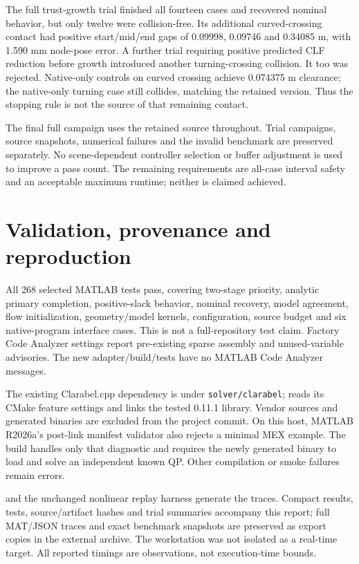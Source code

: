 \documentclass[11pt]{article}
\begin{document}
The full trust-growth trial finished all fourteen cases and recovered nominal
behavior, but only twelve were collision-free. Its additional curved-crossing
contact had positive start/mid/end gaps of 0.09998, 0.09746 and 0.34085 m, with
1.590 mm node-pose error. A further trial requiring positive predicted CLF
reduction before growth introduced another turning-crossing collision. It too
was rejected. Native-only controls on curved crossing achieve 0.074375 m
clearance; the native-only turning case still collides, matching the retained
version. Thus the stopping rule is not the source of that remaining contact.

The final full campaign uses the retained source throughout. Trial campaigns,
source snapshots, numerical failures and the invalid benchmark are preserved
separately. No scene-dependent controller selection or buffer adjustment is
used to improve a pass count. The remaining requirements are all-case interval
safety and an acceptable maximum runtime; neither is claimed achieved.

\section{Validation, provenance and reproduction}
All 268 selected MATLAB tests pass, covering two-stage priority, analytic
primary completion, positive-slack behavior, nominal recovery, model agreement,
flow initialization, geometry/model kernels, configuration, source budget and
six native-program interface cases. This is not a full-repository test claim.
Factory Code Analyzer settings report pre-existing sparse assembly and
unused-variable advisories. The new adapter/build/tests have no MATLAB Code
Analyzer messages.

The existing Clarabel.cpp dependency is under \texttt{solver/clarabel};
 reads its CMake feature settings
and links the tested 0.11.1 library. Vendor sources and generated binaries are
excluded from the project commit. On this host, MATLAB R2026a's post-link
manifest validator also rejects a minimal MEX example. The build handles only
that diagnostic and requires the newly generated binary to load and solve an
independent known QP. Other compilation or smoke failures remain errors.

 and the unchanged nonlinear replay
harness generate the traces. Compact results, tests, source/artifact hashes
and trial summaries accompany this report; full MAT/JSON traces and exact
benchmark snapshots are preserved as export copies in the external archive.
The workstation was not isolated as a real-time target. All reported timings
are observations, not execution-time bounds.
\end{document}
